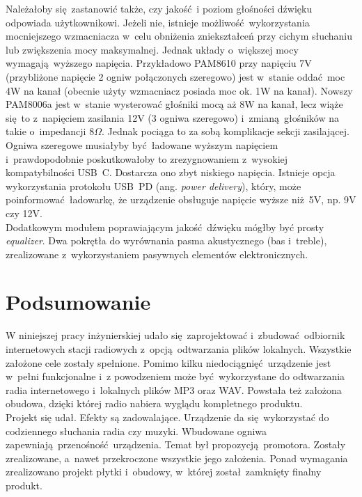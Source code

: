 \documentclass[polish]{aghengthesis}
\begin{document}
			Należałoby się zastanowić także, czy jakość i poziom głośności dźwięku odpowiada użytkownikowi. Jeżeli nie, istnieje możliwość wykorzystania mocniejszego wzmacniacza w~celu obniżenia zniekształceń przy cichym słuchaniu lub zwiększenia mocy maksymalnej. Jednak układy o~większej mocy wymagają wyższego napięcia.
			Przykładowo PAM8610\textsuperscript{\cite{ch5_pam8610}} przy napięciu 7V (przybliżone napięcie 2 ogniw połączonych szeregowo) jest w~stanie oddać moc 4W na kanał (obecnie użyty wzmacniacz posiada moc ok. 1W na kanał). Nowszy PAM8006a\textsuperscript{\cite{ch5_pam8006a}} jest w~stanie wysterować głośniki mocą aż 8W na kanał, lecz wiąże się to z~napięciem zasilania 12V (3 ogniwa szeregowo) i~zmianą głośników na takie o~impedancji $8 \Omega$.
			Jednak pociąga to za sobą komplikacje sekcji zasilającej. Ogniwa szeregowe musiałyby być ładowane wyższym napięciem i~prawdopodobnie poskutkowałoby to zrezygnowaniem z~wysokiej kompatybilności USB~C. Dostarcza ono zbyt niskiego napięcia. Istnieje opcja wykorzystania protokołu USB~PD (ang. \textit{power delivery}), który, może poinformować ładowarkę, że urządzenie obsługuje napięcie wyższe niż 5V, np. 9V czy 12V.
			$ $\\
			
			Dodatkowym modułem poprawiającym jakość dźwięku mógłby być prosty \textit{equalizer}. Dwa pokrętła do wyrównania pasma akustycznego (bas i~treble), zrealizowane z~wykorzystaniem pasywnych elementów elektronicznych.
			
	\section{Podsumowanie}
	
		W niniejszej pracy inżynierskiej udało się zaprojektować i~zbudować odbiornik internetowych stacji radiowych z~opcją odtwarzania plików lokalnych.
		Wszystkie założone cele zostały spełnione. Pomimo kilku niedociągnięć urządzenie jest w~pełni funkcjonalne i~z powodzeniem może być wykorzystane do odtwarzania radia internetowego i~lokalnych plików MP3 oraz WAV. Powstała też założona obudowa, dzięki której radio nabiera wyglądu kompletnego produktu.
		$ $\\
		
		Projekt się udał. Efekty są zadowalające. Urządzenie da się wykorzystać do codziennego słuchania radia czy muzyki. Wbudowane ogniwa zapewniają przenośność urządzenia.
		Temat był propozycją promotora.
		Zostały zrealizowane, a~nawet przekroczone wszystkie jego założenia. Ponad wymagania zrealizowano projekt płytki i~obudowy, w~której został zamknięty finalny produkt.
		$ $\\
		
\end{document}
